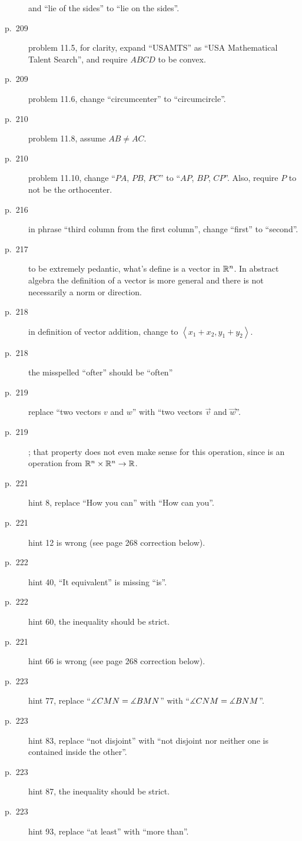 \documentclass[11pt]{scrartcl}
\begin{document}
\begin{description}
  and ``lie of the sides'' to ``lie on the sides''.
\item[p.\  209] problem 11.5, for clarity,
  expand ``USAMTS'' as ``USA Mathematical Talent Search'',
  and require $ABCD$ to be convex.
\item[p.\  209] problem 11.6, change ``circumcenter'' to ``circumcircle''.
\item[p.\  210] problem 11.8, assume $AB \neq AC$.
\item[p.\  210] problem 11.10, change ``$PA$, $PB$, $PC$'' to ``$AP$, $BP$, $CP$''.
  Also, require $P$ to not be the orthocenter.
\item[p.\  216] in phrase ``third column from the first column'',
  change ``first'' to ``second''.
\item[p.\  217] to be extremely pedantic, what's define is a vector in $\mathbb R^n$.
  In abstract algebra the definition of a vector is more general
  and there is not necessarily a norm or direction.
\item[p.\  218] in definition of vector addition,
  change to $\left\langle x_1+x_2, y_1+y_2 \right\rangle$.
\item[p.\  218] the misspelled ``ofter'' should be ``often''
\item[p.\  219] replace ``two vectors $v$ and $w$'' with ``two vectors $\vec v$ and $\vec w$''.
\item[p.\  219] ;
  that property does not even make sense for this operation,
  since is an operation from $\mathbb R^n \times \mathbb R^n \to \mathbb R$.
\item[p.\  221] hint 8, replace ``How you can'' with ``How can you''.
\item[p.\  221] hint 12 is wrong (see page 268 correction below).
\item[p.\  222] hint 40, ``It equivalent'' is missing ``is''.
\item[p.\  222] hint 60, the inequality should be strict.
\item[p.\  221] hint 66 is wrong (see page 268 correction below).
\item[p.\  223] hint 77, replace ``$\measuredangle CMN = \measuredangle BMN$''
  with ``$\measuredangle CNM = \measuredangle BNM$''.
\item[p.\  223] hint 83, replace ``not disjoint'' with
  ``not disjoint nor neither one is contained inside the other''.
\item[p.\  223] hint 87, the inequality should be strict.
\item[p.\  223] hint 93, replace ``at least'' with ``more than''.

\end{description}
\end{document}
